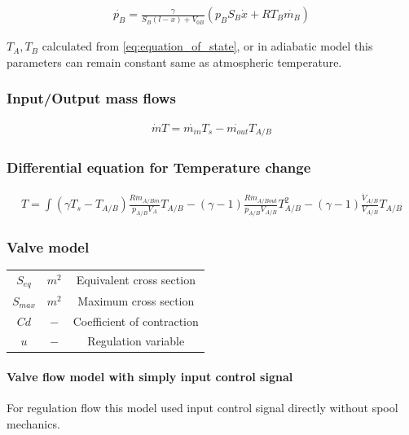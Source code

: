 \documentclass[class=article, crop=false]{standalone}
\begin{document}
\begin{align}
    \dot{p_B} = \frac{\gamma}{S_B (l-x) + V_{0B}} \left(p_B S_B\dot{x} + RT_B\dot{m_B}
    \right)
\end{align}

$T_A, T_B$ calculated from \ref{eq:equation_of_state}, or in adiabatic
model this parameters can remain constant same as atmospheric temperature.

\subsubsection{Input/Output mass flows}

\begin{align}
    \dot{m}T = \dot{m_{in}}T_s - \dot{m_{out}}T_{A/B}
\end{align}


\subsubsection{Differential equation for Temperature change}
\begin{align}
    T = \int{ (\gamma T_s - T_{A/B})
        \frac{R\dot{m}_{A/Bin}}{p_{A/B}V_{A}}T_{A/B} -
    (\gamma-1)\frac{R\dot{m}_{A/Bout}}{p_{A/B}V_{A/B}} T_{A/B}^2 -
(\gamma-1)\frac{\dot{V}_{A/B}}{V_{A/B}}T_{A/B}}
\end{align}


\subsubsection{Valve model} %
\begin{tabular}{ |c|c|c| }
    \hline
    $S_{eq}$                & $m^2$         & Equivalent cross section \\
    $S_{max}$               & $m^2$         & Maximum cross section \\
    $Cd$                    & $-$           & Coefficient of contraction \\
    $u$                     & $-$           & Regulation variable \\
    \hline
\end{tabular}

\paragraph{Valve flow model with simply input control signal}
For regulation flow this model used input control signal directly without
spool mechanics.
\end{document}

